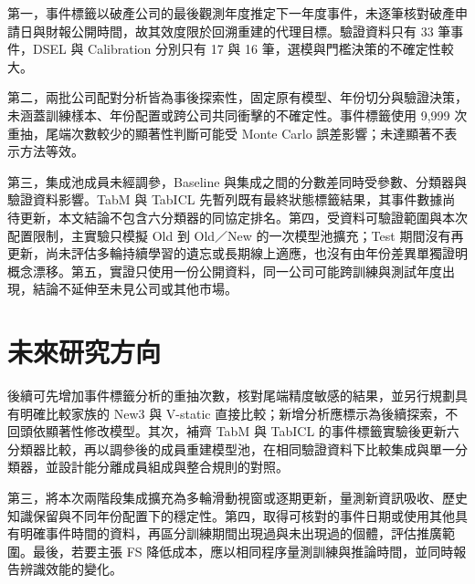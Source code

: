 第一，事件標籤以破產公司的最後觀測年度推定下一年度事件，未逐筆核對破產申請日與財報公開時間，故其效度限於回溯重建的代理目標。驗證資料只有 33 筆事件，DSEL 與 Calibration 分別只有 17 與 16 筆，選模與門檻決策的不確定性較大。

第二，兩批公司配對分析皆為事後探索性，固定原有模型、年份切分與驗證決策，未涵蓋訓練樣本、年份配置或跨公司共同衝擊的不確定性。事件標籤使用 9,999 次重抽，尾端次數較少的顯著性判斷可能受 Monte Carlo 誤差影響；未達顯著不表示方法等效。

第三，集成池成員未經調參，Baseline 與集成之間的分數差同時受參數、分類器與驗證資料影響。TabM 與 TabICL 先暫列既有最終狀態標籤結果，其事件數據尚待更新，本文結論不包含六分類器的同協定排名。第四，受資料可驗證範圍與本次配置限制，主實驗只模擬 Old 到 Old／New 的一次模型池擴充；Test 期間沒有再更新，尚未評估多輪持續學習的遺忘或長期線上適應，也沒有由年份差異單獨證明概念漂移。第五，實證只使用一份公開資料，同一公司可能跨訓練與測試年度出現，結論不延伸至未見公司或其他市場。

\section{未來研究方向}

後續可先增加事件標籤分析的重抽次數，核對尾端精度敏感的結果，並另行規劃具有明確比較家族的 New3 與 V-static 直接比較；新增分析應標示為後續探索，不回頭依顯著性修改模型。其次，補齊 TabM 與 TabICL 的事件標籤實驗後更新六分類器比較，再以調參後的成員重建模型池，在相同驗證資料下比較集成與單一分類器，並設計能分離成員組成與整合規則的對照。

第三，將本次兩階段集成擴充為多輪滑動視窗或逐期更新，量測新資訊吸收、歷史知識保留與不同年份配置下的穩定性。第四，取得可核對的事件日期或使用其他具有明確事件時間的資料，再區分訓練期間出現過與未出現過的個體，評估推廣範圍。最後，若要主張 FS 降低成本，應以相同程序量測訓練與推論時間，並同時報告辨識效能的變化。
\endgroup
